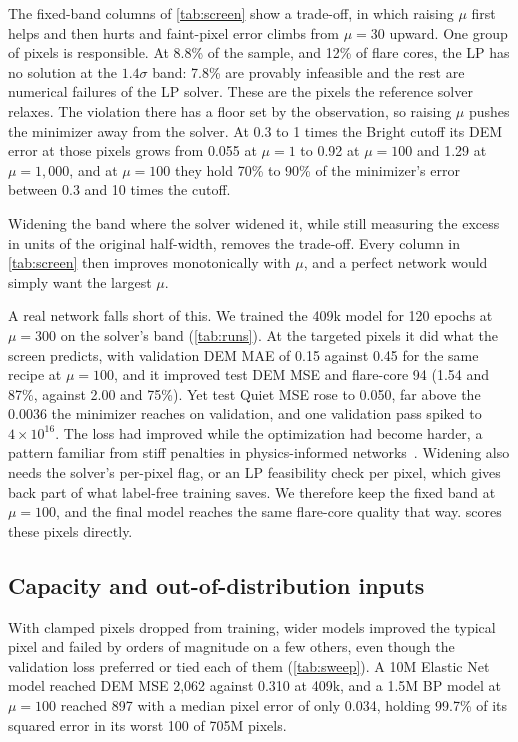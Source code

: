 The fixed-band columns of \cref{tab:screen} show a trade-off, in which raising $\mu$ first helps and then hurts and faint-pixel error climbs from $\mu=30$ upward. One group of pixels is responsible. At 8.8\% of the sample, and 12\% of flare cores, the LP has no solution at the $1.4\sigma$ band: 7.8\% are provably infeasible and the rest are numerical failures of the LP solver. These are the pixels the reference solver relaxes. The violation there has a floor set by the observation, so raising $\mu$ pushes the minimizer away from the solver. At 0.3 to 1 times the Bright cutoff its DEM error at those pixels grows from 0.055 at $\mu=1$ to 0.92 at $\mu=100$ and 1.29 at $\mu=1{,}000$, and at $\mu=100$ they hold 70\% to 90\% of the minimizer's error between 0.3 and 10 times the cutoff.

Widening the band where the solver widened it, while still measuring the excess in units of the original half-width, removes the trade-off. Every column in \cref{tab:screen} then improves monotonically with $\mu$, and a perfect network would simply want the largest $\mu$.

A real network falls short of this. We trained the 409k model for 120 epochs at $\mu=300$ on the solver's band (\cref{tab:runs}). At the targeted pixels it did what the screen predicts, with validation DEM MAE of 0.15 against 0.45 for the same recipe at $\mu=100$, and it improved test DEM MSE and flare-core 94\Ang{} (1.54 and 87\%, against 2.00 and 75\%). Yet test Quiet MSE rose to 0.050, far above the 0.0036 the minimizer reaches on validation, and one validation pass spiked to $4\times10^{16}$. The loss had improved while the optimization had become harder, a pattern familiar from stiff penalties in physics-informed networks~\cite{wang2021pathologies,krishnapriyan2021failure}. Widening also needs the solver's per-pixel flag, or an LP feasibility check per pixel, which gives back part of what label-free training saves. We therefore keep the fixed band at $\mu=100$, and the final model reaches the same flare-core quality that way.  scores these pixels directly.

\subsection{Capacity and out-of-distribution inputs}
\label{sec:capacity}

With clamped pixels dropped from training, wider models improved the typical pixel and failed by orders of magnitude on a few others, even though the validation loss preferred or tied each of them (\cref{tab:sweep}). A 10M Elastic Net model reached DEM MSE 2,062 against 0.310 at 409k, and a 1.5M BP model at $\mu=100$ reached 897 with a median pixel error of only 0.034, holding 99.7\% of its squared error in its worst 100 of 705M pixels.

